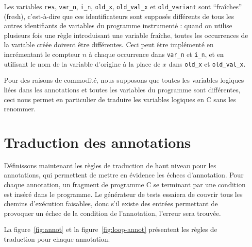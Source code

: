 Les variables \lstinline'res', \lstinline'var_n', \lstinline'i_n',
\lstinline|old_x|, \lstinline'old_val_x' et \lstinline|old_variant| sont
``fraîches'' (fresh), c'est-à-dire que ces identificateurs sont supposés
différents de tous les autres identifiants de variables du programme instrumenté
: quand on utilise plusieurs fois une règle introduisant une variable fraîche,
toutes les occurrences de la variable créée doivent être différentes.
Ceci peut être implémenté en incrémentant le compteur $n$ à chaque occurrence
dans \lstinline'var_n' et \lstinline'i_n', et en utilisant le nom de la variable
d'origine à la place de $x$ dans \lstinline'old_x' et \lstinline'old_val_x'.

Pour des raisons de commodité, nous supposons que toutes les variables logiques
liées dans les annotations et toutes les variables du programme sont
différentes, ceci nous permet en particulier de traduire les variables logiques
en C sans les renommer.

\section{Traduction des annotations \eacsl}
\label{sec:annot}


Définissons maintenant les règles de traduction de haut niveau pour les
annotations, qui permettent de mettre en évidence les échecs d'annotation.
Pour chaque annotation, un fragment de programme C se terminant par une
condition est inséré dans le programme.
Le générateur de tests essaiera de couvrir tous les chemins d'exécution
faisables, donc s'il existe des entrées permettant de provoquer un échec de la
condition de l'annotation, l'erreur sera trouvée.




La figure~\ref{fig:annot} et la figure~\ref{fig:loop-annot} présentent les
règles de traduction pour chaque annotation.

